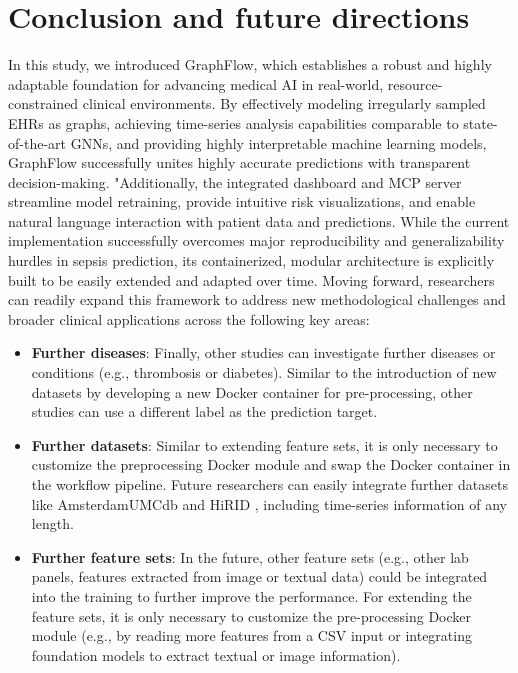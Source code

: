 \documentclass[pdflatex,sn-mathphys-num,lineno]{sn-jnl}
\theoremstyle{thmstyleone}%
\theoremstyle{thmstyletwo}%
\theoremstyle{thmstylethree}%
\begin{document}
\section{Conclusion and future directions}\label{sec13}
In this study, we introduced GraphFlow, which establishes a robust and highly adaptable foundation for advancing medical AI in real-world, resource-constrained clinical environments. By effectively modeling irregularly sampled EHRs as graphs, achieving time-series analysis capabilities comparable to state-of-the-art GNNs, and providing highly interpretable machine learning models, GraphFlow successfully unites highly accurate predictions with transparent decision-making. "Additionally, the integrated dashboard and MCP server streamline model retraining, provide intuitive risk visualizations, and enable natural language interaction with patient data and predictions. While the current implementation successfully overcomes major reproducibility and generalizability hurdles in sepsis prediction, its containerized, modular architecture is explicitly built to be easily extended and adapted over time. Moving forward, researchers can readily expand this framework to address new methodological challenges and broader clinical applications across the following key areas:
\begin{itemize}
    \item \textbf{Further diseases}: Finally, other studies can investigate further diseases or conditions (e.g., thrombosis or diabetes). Similar to the introduction of new datasets by developing a new Docker container for pre-processing, other studies can use a different label as the prediction target.
    \item \textbf{Further datasets}: Similar to extending feature sets, it is only necessary to customize the preprocessing Docker module and swap the Docker container in the workflow pipeline. Future researchers can easily integrate further datasets like AmsterdamUMCdb \cite{Thoral2021} and HiRID \cite{faltys2021hirid}, including time-series information of any length.
    \item \textbf{Further feature sets}: In the future, other feature sets (e.g., other lab panels, features extracted from image or textual data) could be integrated into the training to further improve the performance. For extending the feature sets, it is only necessary to customize the pre-processing Docker module (e.g., by reading more features from a CSV input or integrating foundation models to extract textual or image information).    
    
\end{itemize}
\end{document}
